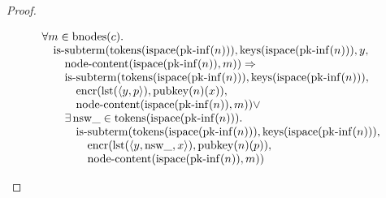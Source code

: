 \documentclass[11pt]{article}
\theoremstyle{plain}
\begin{document}
\begin{proof}
\begin{itemize}[leftmargin=2.8em, itemsep=4pt, parsep=1pt]
\begin{itemize}[leftmargin=2.8em, itemsep=4pt, parsep=1pt]
\begin{equation*}
\begin{array}{@{}l@{}}
\begin{array}{@{}l@{}} \forall m \in \operatorname{bnodes}(c). \\ \quad \operatorname{is\text{-}subterm}(\operatorname{tokens}(\operatorname{ispace}(\operatorname{pk\text{-}inf}(n))), \operatorname{keys}(\operatorname{ispace}(\operatorname{pk\text{-}inf}(n))), y, \\ \quad \quad \operatorname{node\text{-}content}(\operatorname{ispace}(\operatorname{pk\text{-}inf}(n)), m)) \Rightarrow \\ \quad \quad \operatorname{is\text{-}subterm}(\operatorname{tokens}(\operatorname{ispace}(\operatorname{pk\text{-}inf}(n))), \operatorname{keys}(\operatorname{ispace}(\operatorname{pk\text{-}inf}(n))), \\ \quad \quad \quad \operatorname{encr}(\operatorname{lst}(\langle y, p \rangle), \operatorname{pubkey}(n)(x)), \\ \quad \quad \quad \operatorname{node\text{-}content}(\operatorname{ispace}(\operatorname{pk\text{-}inf}(n)), m)) \vee \\ \quad \quad \exists \operatorname{nsw\_} \in \operatorname{tokens}(\operatorname{ispace}(\operatorname{pk\text{-}inf}(n))). \\ \quad \quad \quad \operatorname{is\text{-}subterm}(\operatorname{tokens}(\operatorname{ispace}(\operatorname{pk\text{-}inf}(n))), \operatorname{keys}(\operatorname{ispace}(\operatorname{pk\text{-}inf}(n))), \\ \quad \quad \quad \quad \operatorname{encr}(\operatorname{lst}(\langle y, \operatorname{nsw\_}, x \rangle), \operatorname{pubkey}(n)(p)), \\ \quad \quad \quad \quad \operatorname{node\text{-}content}(\operatorname{ispace}(\operatorname{pk\text{-}inf}(n)), m)) \end{array} \\

\end{array}
\end{equation*}
\end{itemize}
\end{itemize}
\end{proof}
\end{document}
